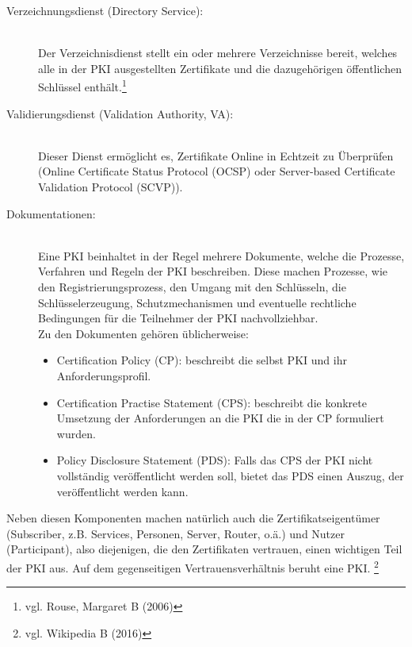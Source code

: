 \begin{description}
\item[Verzeichnungsdienst (Directory Service):]\hfill \\
Der Verzeichnisdienst stellt ein oder mehrere Verzeichnisse bereit, welches alle in der PKI ausgestellten Zertifikate und die dazugehörigen öffentlichen Schlüssel enthält.\footnote{vgl. Rouse, Margaret B (2006)}
\item[Validierungsdienst (Validation Authority, VA):]\hfill \\
Dieser Dienst ermöglicht es, Zertifikate Online in Echtzeit zu Überprüfen (Online Certificate Status Protocol (OCSP) oder Server-based Certificate Validation Protocol (SCVP)).
\item[Dokumentationen:]\hfill \\
Eine PKI beinhaltet in der Regel mehrere Dokumente, welche die Prozesse, Verfahren und Regeln der PKI beschreiben. Diese machen Prozesse, wie den Registrierungsprozess, den Umgang mit den Schlüsseln, die Schlüsselerzeugung, Schutzmechanismen und eventuelle rechtliche Bedingungen für die Teilnehmer der PKI nachvollziehbar.\\
Zu den Dokumenten gehören üblicherweise:
	\begin{itemize}
	\item Certification Policy (CP): beschreibt die selbst PKI und ihr Anforderungsprofil.
	\item Certification Practise Statement (CPS): beschreibt die konkrete Umsetzung der Anforderungen an die PKI die in der CP formuliert wurden.
	\item Policy Disclosure Statement (PDS): Falls das CPS der PKI nicht vollständig veröffentlicht werden soll, bietet das PDS einen Auszug, der veröffentlicht werden kann.
	\end{itemize}
\end{description}
Neben diesen Komponenten machen natürlich auch die Zertifikatseigentümer (Subscriber, z.B. Services, Personen, Server, Router, o.ä.) und Nutzer (Participant), also diejenigen, die den Zertifikaten vertrauen, einen wichtigen Teil der PKI aus. Auf dem gegenseitigen Vertrauensverhältnis beruht eine PKI. \footnote{vgl. Wikipedia B (2016)}
